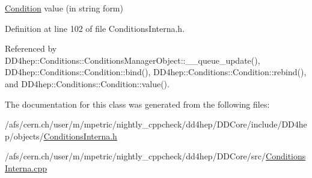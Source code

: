 \hyperlink{class_d_d4hep_1_1_conditions_1_1_condition}{Condition} value (in string form) 



Definition at line 102 of file Conditions\+Interna.\+h.



Referenced by D\+D4hep\+::\+Conditions\+::\+Conditions\+Manager\+Object\+::\+\_\+\+\_\+queue\+\_\+update(), D\+D4hep\+::\+Conditions\+::\+Condition\+::bind(), D\+D4hep\+::\+Conditions\+::\+Condition\+::rebind(), and D\+D4hep\+::\+Conditions\+::\+Condition\+::value().



The documentation for this class was generated from the following files\+:\begin{DoxyCompactItemize}
\item 
/afs/cern.\+ch/user/m/mpetric/nightly\+\_\+cppcheck/dd4hep/\+D\+D\+Core/include/\+D\+D4hep/objects/\hyperlink{_d_d_core_2include_2_d_d4hep_2objects_2_conditions_interna_8h}{Conditions\+Interna.\+h}\item 
/afs/cern.\+ch/user/m/mpetric/nightly\+\_\+cppcheck/dd4hep/\+D\+D\+Core/src/\hyperlink{_d_d_core_2src_2_conditions_interna_8cpp}{Conditions\+Interna.\+cpp}\end{DoxyCompactItemize}
